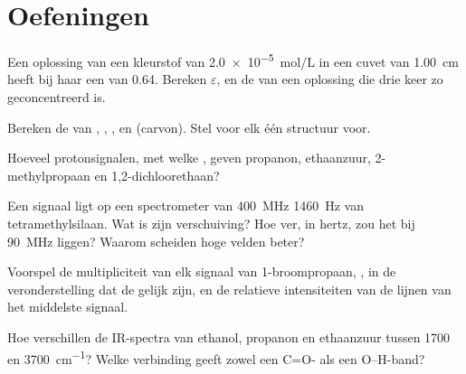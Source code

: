 \section{Oefeningen}

\begin{exercise}[$\star$]\label{exo:b1:structure-spectroscopy:1}
Een oplossing van een kleurstof van \qty{2.0e-5}{mol/L} in een cuvet van
\qty{1.00}{cm} heeft bij haar  een  van 0.64.
Bereken $\varepsilon$, en de  van een oplossing die drie keer
zo geconcentreerd is.
\end{exercise}

\begin{exercise}[$\star$]\label{exo:b1:structure-spectroscopy:2}
Bereken de  van , , ,
 en  (carvon). Stel voor elk één structuur voor.
\end{exercise}

\begin{exercise}[$\star$]\label{exo:b1:structure-spectroscopy:3}
Hoeveel protonsignalen, met welke , geven propanon,
ethaanzuur, 2-methylpropaan en 1,2-dichloorethaan?
\end{exercise}

\begin{exercise}[$\star$]\label{exo:b1:structure-spectroscopy:4}
Een signaal ligt op een spectrometer van \qty{400}{MHz}
\qty{1460}{Hz} van tetramethylsilaan. Wat is zijn verschuiving? Hoe ver,
in hertz, zou het bij \qty{90}{MHz} liggen? Waarom scheiden hoge velden
 beter?
\end{exercise}

\begin{exercise}[$\star\star$]\label{exo:b1:structure-spectroscopy:5}
Voorspel de multipliciteit van elk signaal van 1-broompropaan,
, in de veronderstelling dat de 
gelijk zijn, en de relatieve intensiteiten van de lijnen van het
middelste signaal.
\end{exercise}

\begin{exercise}[$\star\star$]\label{exo:b1:structure-spectroscopy:6}
Hoe verschillen de IR-spectra van ethanol, propanon en ethaanzuur tussen
1700 en \qty{3700}{cm^{-1}}? Welke verbinding geeft zowel een C=O- als
een O--H-band?
\end{exercise}


